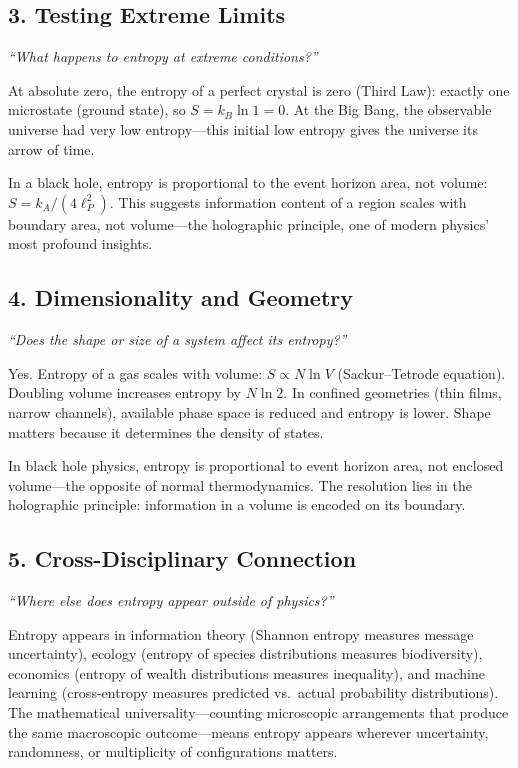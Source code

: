 \subsection*{3. Testing Extreme Limits}
\textit{``What happens to entropy at extreme conditions?''}

At absolute zero, the entropy of a perfect crystal is zero (Third Law): exactly one microstate (ground state), so $S = k_B \ln 1 = 0$. At the Big Bang, the observable universe had very low entropy---this initial low entropy gives the universe its arrow of time.

In a black hole, entropy is proportional to the event horizon area, not volume: $S = k_A / (4 \ell_P^2)$. This suggests information content of a region scales with boundary area, not volume---the holographic principle, one of modern physics' most profound insights.

\subsection*{4. Dimensionality and Geometry}
\textit{``Does the shape or size of a system affect its entropy?''}

Yes. Entropy of a gas scales with volume: $S \propto N \ln V$ (Sackur--Tetrode equation). Doubling volume increases entropy by $N \ln 2$. In confined geometries (thin films, narrow channels), available phase space is reduced and entropy is lower. Shape matters because it determines the density of states.

In black hole physics, entropy is proportional to event horizon area, not enclosed volume---the opposite of normal thermodynamics. The resolution lies in the holographic principle: information in a volume is encoded on its boundary.

\subsection*{5. Cross-Disciplinary Connection}
\textit{``Where else does entropy appear outside of physics?''}

Entropy appears in information theory (Shannon entropy measures message uncertainty), ecology (entropy of species distributions measures biodiversity), economics (entropy of wealth distributions measures inequality), and machine learning (cross-entropy measures predicted vs.\ actual probability distributions). The mathematical universality---counting microscopic arrangements that produce the same macroscopic outcome---means entropy appears wherever uncertainty, randomness, or multiplicity of configurations matters.


